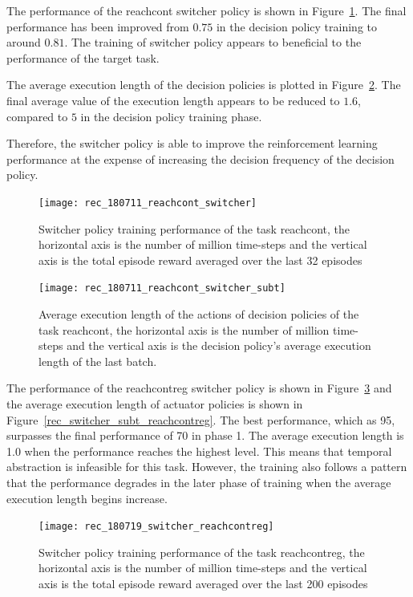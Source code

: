 The performance of the reachcont switcher policy is shown in Figure~\ref{fig:rec_reachcont_switcher}. The final performance has been improved from $0.75$ in the decision policy training to around $0.81$. The training of switcher policy appears to beneficial to the performance of the target task.

The average execution length of the decision policies is plotted in Figure~\ref{fig:rec_reachcont_switcher_subt}. The final average value of the execution length appears to be reduced to $1.6$, compared to $5$ in the decision policy training phase.

Therefore, the switcher policy is able to improve the reinforcement learning performance at the expense of increasing the decision frequency of the decision policy.

\begin{figure}[!htbp]
	\centering
	\texttt{[image: rec\_180711\_reachcont\_switcher]}
	\caption{Switcher policy training performance of the task reachcont, the horizontal axis is the number of million time-steps and the vertical axis is the total episode reward averaged over the last 32 episodes}
	\label{fig:rec_reachcont_switcher}
\end{figure}

\begin{figure}[!htbp]
	\centering
	\texttt{[image: rec\_180711\_reachcont\_switcher\_subt]}
	\caption{Average execution length of the actions of decision policies of the task reachcont, the horizontal axis is the number of million time-steps and the vertical axis is the decision policy's average execution length of the last batch.}
	\label{fig:rec_reachcont_switcher_subt}
\end{figure}

The performance of the reachcontreg switcher policy is shown in Figure~\ref{rec_switcher_reachcontreg} and the average execution length of actuator policies is shown in Figure~\ref{rec_switcher_subt_reachcontreg}. The best performance, which as 95, surpasses the final performance of 70 in phase 1. The average execution length is 1.0 when the performance reaches the highest level. This means that temporal abstraction is infeasible for this task. However, the training also follows a pattern that the performance degrades in the later phase of training when the average execution length begins increase.
\begin{figure}[!htbp]
	\centering
	\texttt{[image: rec\_180719\_switcher\_reachcontreg]}
	\caption{Switcher policy training performance of the task reachcontreg, the horizontal axis is the number of million time-steps and the vertical axis is the total episode reward averaged over the last 200 episodes}
	\label{rec_switcher_reachcontreg}
\end{figure}


